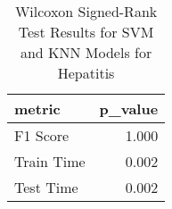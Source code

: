 \begin{table}
\centering
\caption{Wilcoxon Signed-Rank Test Results for SVM and KNN Models for Hepatitis}
\label{tab:svm_knn_wilcoxon_comparison_hepatitis}
\begin{tabular}{lr}
\toprule
metric & p_value \\
\midrule
F1 Score & 1.000 \\
Train Time & 0.002 \\
Test Time & 0.002 \\
\bottomrule
\end{tabular}
\end{table}
